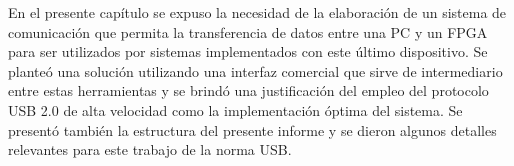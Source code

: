 En el presente capítulo se expuso la necesidad de la elaboración de un sistema de comunicación que permita la transferencia de datos entre una PC y un FPGA para ser utilizados por sistemas implementados con este último dispositivo.
Se planteó una solución utilizando una interfaz comercial que sirve de intermediario entre estas herramientas y se brindó una justificación del empleo del protocolo USB 2.0 de alta velocidad como la implementación óptima del sistema.
Se presentó también la estructura del presente informe y se dieron algunos detalles relevantes para este trabajo de la norma USB.\\